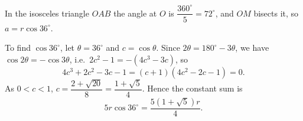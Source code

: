 In the isosceles triangle $OAB$ the angle at $O$ is $\dfrac{360^\circ}{5}=72^\circ$, and $OM$ bisects it, so $a=r\cos36^\circ$.

To find $\cos36^\circ$, let $\theta=36^\circ$ and $c=\cos\theta$. Since $2\theta=180^\circ-3\theta$, we have $\cos2\theta=-\cos3\theta$, i.e.\ $2c^2-1=-(4c^3-3c)$, so
\[
4c^3+2c^2-3c-1=(c+1)(4c^2-2c-1)=0 .
\]
As $0<c<1$, $c=\dfrac{2+\sqrt{20}}{8}=\dfrac{1+\sqrt5}{4}$. Hence the constant sum is
\[
5r\cos36^\circ=\boxed{\dfrac{5\left(1+\sqrt5\right)r}{4}}.
\]
